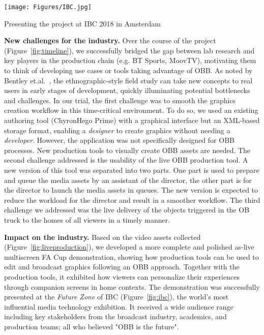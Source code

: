 \documentclass[sigchi-a, authorversion]{acmart}
\begin{document}
\begin{marginfigure}
    \hspace*{-1cm}
    \texttt{[image: Figures/IBC.jpg]}
    \caption{Presenting the project at IBC 2018 in Amsterdam}
    \label{fig:ibc}
\end{marginfigure}

\textbf{New challenges for the industry.} Over the course of the project (Figure~\ref{fig:timeline}), we successfully bridged the gap between lab research 
and key players in the production chain (e.g. BT Sports, MoovTV),
motivating them to think of developing use cases or tools taking advantage of OBB. As noted by Bentley et.al.~\cite{bentley2009},
the ethnographic-style field study can take new concepts to real users in
early stages of development, quickly illuminating potential
bottlenecks and challenges. In our trial, the first challenge was to smooth the
graphics creation workflow in this time-critical environment. To
do so, we used an existing authoring tool (ChyronHego Prime) with a graphical
interface but an XML-based storage format, enabling a \textit{designer} to create
graphics without needing a \textit{developer}. However, the application was not specifically designed for OBB processes. New production tools to visually create OBB assets are needed. The second challenge addressed is the usability of the live OBB production tool. A new version of this tool was separated into two parts. One part is used to prepare and queue the media assets by an assistant of the director, the other part is for the director to launch the media assets in queues. The new version is expected to reduce the workload for the director and result in a smoother workflow. The third challenge we addressed was the live delivery of the objects triggered in the OB truck to the homes of all viewers in a timely manner.

\vspace{5pt}\noindent\textbf{Impact on the industry.} Based on the video assets
collected (Figure~\ref{fig:liveproduction}), we developed a more complete and
polished as-live multiscreen FA Cup demonstration, showing how production
tools can be used to edit and broadcast graphics following an OBB approach. Together with
the production tools, it exhibited how viewers can personalize their experiences
through companion screens in home contexts. The
demonstration was successfully presented at the \emph{Future Zone} of IBC (Figure~\ref{fig:ibc}), the world's
most influential media technology exhibition. It received a wide
audience range including key stakeholders from the broadcast industry,
academics, and production teams; all who believed "OBB is the future".
\end{document}
